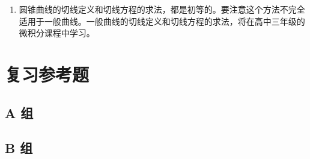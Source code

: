 \begin{enumerate}[C、,itemindent=4.5em]
\begin{enumerate}[(1)]
  \end{enumerate}
  \begin{figure}
    \begin{minipage}[b]{0.48\linewidth}\centering
      \caption{}\label{fig:2-37}
    \end{minipage}
    \begin{minipage}[b]{0.48\linewidth}\centering
      \caption{}\label{fig:2-38}
    \end{minipage}
  \end{figure}
  \item 圆锥曲线的切线定义和切线方程的求法，都是初等的。要注意这个方法不完全适用于一般曲线。一般曲线的切线定义和切线方程的求法，将在高中三年级的微积分课程中学习。
\end{enumerate}
\chapter*{复习参考题}
\section*{A 组}
\begin{question}
  \item 
  \item 
  \item 
  \item 
  \item 
  \item 
  \item 
  \item 
  \item 
  \item 
  \item 
  \item 
  \item 
  \item 
  \item 
  \item 
  \item 
  \item 
  \item 
  \item 
  \item 
  \item 
\end{question}
\section*{B 组}
\begin{question}[resume]
  \item 
  \item 
  \item 
  \item 
  \item 
  \item 
  \item 
\end{question}